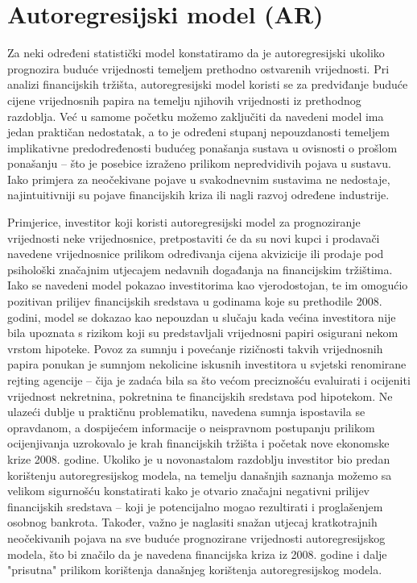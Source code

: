 \documentclass[a4paper,12pt,oneside]{memoir}
\begin{document}
        \section{Autoregresijski model (AR)}

            Za neki određeni statistički model konstatiramo da je autoregresijski ukoliko prognozira buduće vrijednosti temeljem prethodno ostvarenih vrijednosti. Pri analizi financijskih tržišta, autoregresijski model koristi se za predviđanje buduće cijene vrijednosnih papira na temelju njihovih vrijednosti iz prethodnog razdoblja. Već u samome početku možemo zaključiti da navedeni model ima jedan praktičan nedostatak, a to je određeni stupanj nepouzdanosti temeljem implikativne predodređenosti budućeg ponašanja sustava u ovisnosti o prošlom ponašanju -- što je posebice izraženo prilikom nepredvidivih pojava u sustavu. Iako primjera za neočekivane pojave u svakodnevnim sustavima ne nedostaje, najintuitivniji su pojave financijskih kriza ili nagli razvoj određene industrije.

            Primjerice, investitor koji koristi autoregresijski model za prognoziranje vrijednosti neke vrijednosnice, pretpostaviti će da su novi kupci i prodavači navedene vrijednosnice prilikom određivanja cijena akvizicije ili prodaje pod psihološki značajnim utjecajem nedavnih događanja na financijskim tržištima. Iako se navedeni model pokazao investitorima kao vjerodostojan, te im omogućio pozitivan prilijev financijskih sredstava u godinama koje su prethodile 2008. godini, model se dokazao kao nepouzdan u slučaju kada većina investitora nije bila upoznata s rizikom koji su predstavljali vrijednosni papiri osigurani nekom vrstom hipoteke. Povoz za sumnju i povećanje rizičnosti takvih vrijednosnih papira ponukan je sumnjom nekolicine iskusnih investitora u svjetski renomirane rejting agencije -- čija je zadaća bila sa što većom preciznošću evaluirati i ocijeniti vrijednost nekretnina, pokretnina te financijskih sredstava pod hipotekom. Ne ulazeći dublje u praktičnu problematiku, navedena sumnja ispostavila se opravdanom, a dospijećem informacije o neispravnom postupanju prilikom ocijenjivanja uzrokovalo je krah financijskih tržišta i početak nove ekonomske krize 2008. godine. Ukoliko je u novonastalom razdoblju investitor bio predan korištenju autoregresijskog modela, na temelju današnjih saznanja možemo sa velikom sigurnošću konstatirati kako je otvario značajni negativni prilijev financijskih sredstava -- koji je potencijalno mogao rezultirati i proglašenjem osobnog bankrota. Također, važno je naglasiti snažan utjecaj kratkotrajnih neočekivanih pojava na sve buduće prognozirane vrijednosti autoregresijskog modela, što bi značilo da je navedena financijska kriza iz 2008. godine i dalje "prisutna" prilikom korištenja današnjeg korištenja autoregresijskog modela.
\end{document}
